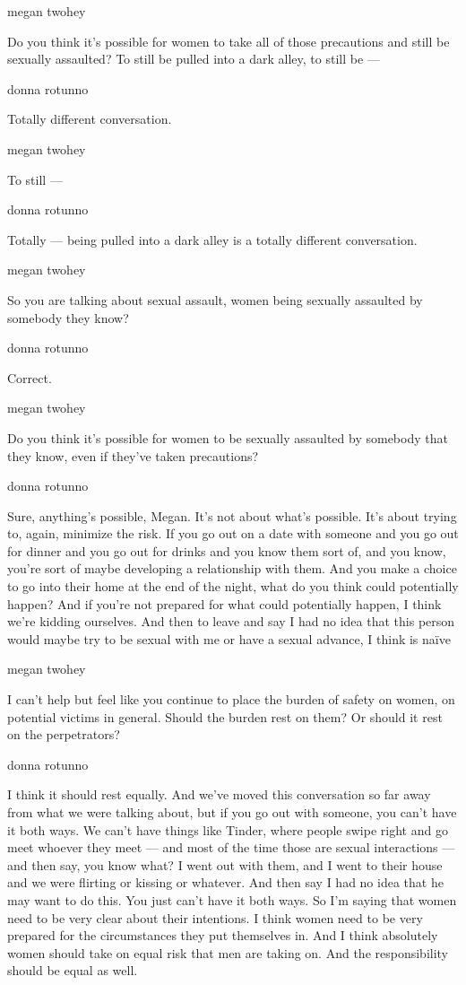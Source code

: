megan twohey

Do you think it's possible for women to take all of those precautions
and still be sexually assaulted? To still be pulled into a dark alley,
to still be ---

donna rotunno

Totally different conversation.

megan twohey

To still ---

donna rotunno

Totally --- being pulled into a dark alley is a totally different
conversation.

megan twohey

So you are talking about sexual assault, women being sexually assaulted
by somebody they know?

donna rotunno

Correct.

megan twohey

Do you think it's possible for women to be sexually assaulted by
somebody that they know, even if they've taken precautions?

donna rotunno

Sure, anything's possible, Megan. It's not about what's possible. It's
about trying to, again, minimize the risk. If you go out on a date with
someone and you go out for dinner and you go out for drinks and you know
them sort of, and you know, you're sort of maybe developing a
relationship with them. And you make a choice to go into their home at
the end of the night, what do you think could potentially happen? And if
you're not prepared for what could potentially happen, I think we're
kidding ourselves. And then to leave and say I had no idea that this
person would maybe try to be sexual with me or have a sexual advance, I
think is naïve

megan twohey

I can't help but feel like you continue to place the burden of safety on
women, on potential victims in general. Should the burden rest on them?
Or should it rest on the perpetrators?

donna rotunno

I think it should rest equally. And we've moved this conversation so far
away from what we were talking about, but if you go out with someone,
you can't have it both ways. We can't have things like Tinder, where
people swipe right and go meet whoever they meet --- and most of the
time those are sexual interactions --- and then say, you know what? I
went out with them, and I went to their house and we were flirting or
kissing or whatever. And then say I had no idea that he may want to do
this. You just can't have it both ways. So I'm saying that women need to
be very clear about their intentions. I think women need to be very
prepared for the circumstances they put themselves in. And I think
absolutely women should take on equal risk that men are taking on. And
the responsibility should be equal as well.

